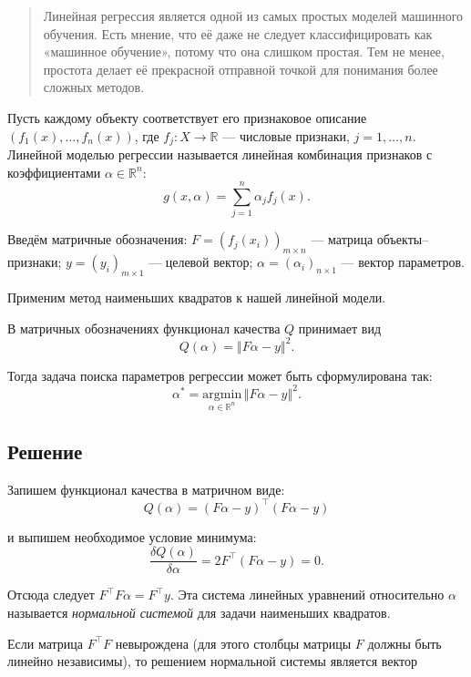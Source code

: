 \documentclass[11pt,a4paper]{article}
\begin{document}
\begin{quote}
Линейная регрессия является одной из самых простых моделей машинного
обучения. Есть мнение, что её даже не следует классифицировать как
«машинное обучение», потому что она слишком простая. Тем не менее,
простота делает её прекрасной отправной точкой для понимания более
сложных методов.
\end{quote}

Пусть каждому объекту соответствует его признаковое описание
\(\left( f_1(x), \ldots, f_n(x)\right)\), где
\(f_j: X \rightarrow \mathbb{R}\) --- числовые признаки,
\(j = 1, \ldots , n\). Линейной моделью регрессии называется линейная
комбинация признаков с коэффициентами \(\alpha \in \mathbb{R}^n\):
\[ g(x, \alpha) = \sum_{j=1}^n \alpha_j f_j(x). \]

Введём матричные обозначения:
\(F = \left( f_j(x_i) \right)_{m \times n}\) --- матрица
объекты--признаки; \(y = \left( y_i \right)_{m \times 1}\) --- целевой
вектор; \(\alpha = \left( \alpha_i \right)_{n \times 1}\) --- вектор
параметров.

Применим метод наименьших квадратов к нашей линейной модели.

В матричных обозначениях функционал качества \(Q\) принимает вид
\[ Q(\alpha) = \left\Vert F\alpha - y \right\Vert^2. \]

Тогда задача поиска параметров регрессии может быть сформулирована так:
\[ \alpha^* = \underset{\alpha \in \mathbb{R}^n}{\text{argmin}} \, {\left\Vert F\alpha - y \right\Vert^2}. \]

    \hypertarget{ux440ux435ux448ux435ux43dux438ux435}{%
\subsection{Решение}\label{ux440ux435ux448ux435ux43dux438ux435}}

Запишем функционал качества в матричном виде:
\[ Q(\alpha) = (F\alpha - y)^\top (F\alpha - y) \]

и выпишем необходимое условие минимума:
\[ \frac{\delta Q(\alpha)}{\delta \alpha} = 2F^\top (F\alpha - y) = 0. \]

Отсюда следует \(F^{\top} F \alpha = F^{\top}y\). Эта система линейных
уравнений относительно \(\alpha\) называется \emph{нормальной системой}
для задачи наименьших квадратов.

Если матрица \(F^{\top} F\) невырождена (для этого столбцы матрицы \(F\)
должны быть линейно независимы), то решением нормальной системы является
вектор
\end{document}

